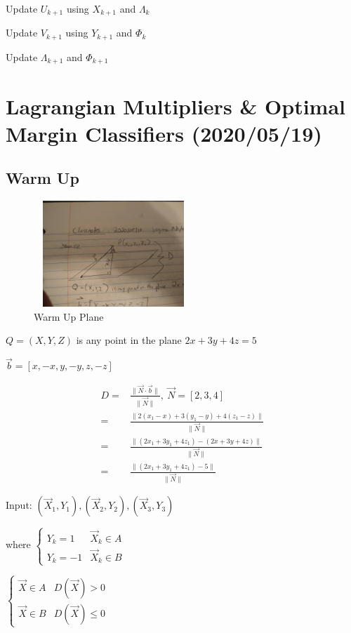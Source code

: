 \documentclass[11pt]{article}
\begin{document}
Update \(U_{k + 1}\) using \(X_{k + 1}\) and \(\Lambda_k\)

Update \(V_{k + 1}\) using \(Y_{k + 1}\) and \(\Phi_k\)

Update \(\Lambda_{k + 1}\) and \(\Phi_{k + 1}\)
\section{Lagrangian Multipliers \& Optimal Margin Classifiers (2020/05/19)}
\label{sec:org07b4661}
\subsection{Warm Up}
\label{sec:orge942742}
\begin{figure}[htbp]
\centering
\includegraphics[width=6cm,height=4cm]{./resources/warmup_plane.jpg}
\caption{\label{fig:org6a63ea5}Warm Up Plane}
\end{figure}

\(Q = (X, Y, Z)\) is any point in the plane \(2x + 3y + 4z = 5\)

\(\vec b = [x, -x, y, -y, z, -z]\)

\begin{equation}
\begin{split}
D = & \frac{\|\vec N \cdot \vec b\|}{\|\vec N\|}, \ \vec N = [2, 3, 4]\\
= & \frac{\|2(x_1 - x) + 3(y_1 - y) + 4(z_1 - z)\|}{\|\vec N\|}\\
= & \frac{\|(2 x_1 + 3 y_1 + 4 z_1) - (2x + 3y + 4z)\|}{\|\vec N\|}\\
= & \frac{\|(2x_1 + 3 y_1 + 4 z_1) - 5\|}{\|\vec N\|}
\end{split}
\end{equation}

Input: \((\vec X_1, Y_1),(\vec X_2, Y_2),(\vec X_3, Y_3)\)

where \(\begin{cases} Y_k = 1 & \vec X_k \in A\\ Y_k = -1 & \vec X_k \in B \end{cases}\)

\(\begin{cases} \vec X \in A & D(\vec X) > 0\\ \vec X \in B & D(\vec X) \leq 0 \end{cases}\)
\end{document}
